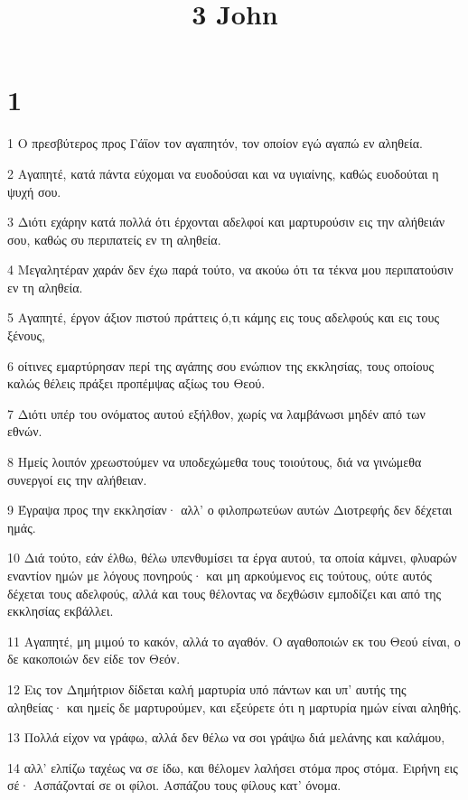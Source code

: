 

\title{3 John}


\chapter{1}

\par 1 Ο πρεσβύτερος προς Γάϊον τον αγαπητόν, τον οποίον εγώ αγαπώ εν αληθεία.
\par 2 Αγαπητέ, κατά πάντα εύχομαι να ευοδούσαι και να υγιαίνης, καθώς ευοδούται η ψυχή σου.
\par 3 Διότι εχάρην κατά πολλά ότι έρχονται αδελφοί και μαρτυρούσιν εις την αλήθειάν σου, καθώς συ περιπατείς εν τη αληθεία.
\par 4 Μεγαλητέραν χαράν δεν έχω παρά τούτο, να ακούω ότι τα τέκνα μου περιπατούσιν εν τη αληθεία.
\par 5 Αγαπητέ, έργον άξιον πιστού πράττεις ό,τι κάμης εις τους αδελφούς και εις τους ξένους,
\par 6 οίτινες εμαρτύρησαν περί της αγάπης σου ενώπιον της εκκλησίας, τους οποίους καλώς θέλεις πράξει προπέμψας αξίως του Θεού.
\par 7 Διότι υπέρ του ονόματος αυτού εξήλθον, χωρίς να λαμβάνωσι μηδέν από των εθνών.
\par 8 Ημείς λοιπόν χρεωστούμεν να υποδεχώμεθα τους τοιούτους, διά να γινώμεθα συνεργοί εις την αλήθειαν.
\par 9 Έγραψα προς την εκκλησίαν· αλλ' ο φιλοπρωτεύων αυτών Διοτρεφής δεν δέχεται ημάς.
\par 10 Διά τούτο, εάν έλθω, θέλω υπενθυμίσει τα έργα αυτού, τα οποία κάμνει, φλυαρών εναντίον ημών με λόγους πονηρούς· και μη αρκούμενος εις τούτους, ούτε αυτός δέχεται τους αδελφούς, αλλά και τους θέλοντας να δεχθώσιν εμποδίζει και από της εκκλησίας εκβάλλει.
\par 11 Αγαπητέ, μη μιμού το κακόν, αλλά το αγαθόν. Ο αγαθοποιών εκ του Θεού είναι, ο δε κακοποιών δεν είδε τον Θεόν.
\par 12 Εις τον Δημήτριον δίδεται καλή μαρτυρία υπό πάντων και υπ' αυτής της αληθείας· και ημείς δε μαρτυρούμεν, και εξεύρετε ότι η μαρτυρία ημών είναι αληθής.
\par 13 Πολλά είχον να γράφω, αλλά δεν θέλω να σοι γράψω διά μελάνης και καλάμου,
\par 14 αλλ' ελπίζω ταχέως να σε ίδω, και θέλομεν λαλήσει στόμα προς στόμα. Ειρήνη εις σέ· Ασπάζονταί σε οι φίλοι. Ασπάζου τους φίλους κατ' όνομα.


